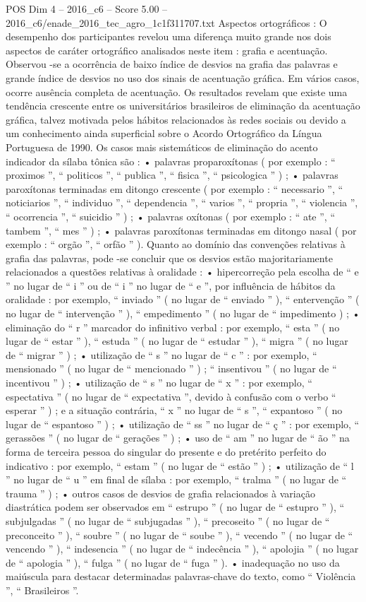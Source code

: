 \begin{textsample}{POS Dim 4 – 2016\_c6 – Score 5.00 – 2016\_c6/enade\_2016\_tec\_agro\_1c1f311707.txt}
Aspectos ortográficos : O desempenho dos participantes revelou uma diferença muito grande nos dois aspectos de caráter ortográfico analisados neste item : grafia e acentuação.
Observou -se a ocorrência de baixo índice de desvios na grafia das palavras e grande índice de desvios no uso dos sinais de acentuação gráfica.
Em vários casos, ocorre ausência completa de acentuação.
Os resultados revelam que existe uma tendência crescente entre os universitários brasileiros de eliminação da acentuação gráfica, talvez motivada pelos hábitos relacionados às redes sociais ou devido a um conhecimento ainda superficial sobre o Acordo Ortográfico da Língua Portuguesa de 1990.
Os casos mais sistemáticos de eliminação do acento indicador da sílaba tônica são : • palavras proparoxítonas ( por exemplo : “ proximos ”, “ politicos ”, “ publica ”, “ fisica ”, “ psicologica ” ) ; • palavras paroxítonas terminadas em ditongo crescente ( por exemplo : “ necessario ”, “ noticiarios ”, “ individuo ”, “ dependencia ”, “ varios ”, “ propria ”, “ violencia ”, “ ocorrencia ”, “ suicidio ” ) ; • palavras oxítonas ( por exemplo : “ ate ”, “ tambem ”, “ mes ” ) ; • palavras paroxítonas terminadas em ditongo nasal ( por exemplo : “ orgão ”, “ orfão ” ).
Quanto ao domínio das convenções relativas à grafia das palavras, pode -se concluir que os desvios estão majoritariamente relacionados a questões relativas à oralidade : • hipercorreção pela escolha de “ e ” no lugar de “ i ” ou de “ i ” no lugar de “ e ”, por influência de hábitos da oralidade : por exemplo, “ inviado ” ( no lugar de “ enviado ” ), “ entervenção ” ( no lugar de “ intervenção ” ), “ empedimento ” ( no lugar de “ impedimento ) ; • eliminação do “ r ” marcador do infinitivo verbal : por exemplo, “ esta ” ( no lugar de “ estar ” ), “ estuda ” ( no lugar de “ estudar ” ), “ migra ” ( no lugar de “ migrar ” ) ; • utilização de “ s ” no lugar de “ c ” : por exemplo, “ mensionado ” ( no lugar de “ mencionado ” ) ; “ insentivou ” ( no lugar de “ incentivou ” ) ; • utilização de “ s ” no lugar de “ x ” : por exemplo, “ espectativa ” ( no lugar de “ expectativa ”, devido à confusão com o verbo “ esperar ” ) ; e a situação contrária, “ x ” no lugar de “ s ”, “ expantoso ” ( no lugar de “ espantoso ” ) ; • utilização de “ ss ” no lugar de “ ç ” : por exemplo, “ gerassões ” ( no lugar de “ gerações ” ) ; • uso de “ am ” no lugar de “ ão ” na forma de terceira pessoa do singular do presente e do pretérito perfeito do indicativo : por exemplo, “ estam ” ( no lugar de “ estão ” ) ; • utilização de “ l ” no lugar de “ u ” em final de sílaba : por exemplo, “ tralma ” ( no lugar de “ trauma ” ) ; • outros casos de desvios de grafia relacionados à variação diastrática podem ser observados em “ estrupo ” ( no lugar de “ estupro ” ), “ subjulgadas ” ( no lugar de “ subjugadas ” ), “ precoseito ” ( no lugar de “ preconceito ” ), “ soubre ” ( no lugar de “ soube ” ), “ vecendo ” ( no lugar de “ vencendo ” ), “ indesencia ” ( no lugar de “ indecência ” ), “ apolojia ” ( no lugar de “ apologia ” ), “ fulga ” ( no lugar de “ fuga ” ). • inadequação no uso da maiúscula para destacar determinadas palavras-chave do texto, como “ Violência ”, “ Brasileiros ”.

\end{textsample}
